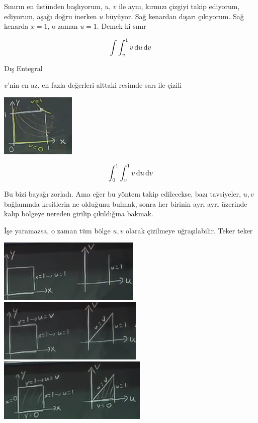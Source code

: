 \documentclass[12pt,fleqn]{article}\usepackage{../../common}
\begin{document}
Sınırın en üstünden başlıyorum, $u$, $v$ ile aynı, kırmızı çizgiyi takip
ediyorum, ediyorum, aşağı doğru inerken $u$ büyüyor. Sağ kenardan dışarı
çıkıyorum. Sağ kenarda $x=1$, o zaman $u = 1$. Demek ki sınır

$$ \int \int _v^1 v \,\mathrm{d} u \,\mathrm{d} v $$

Dış Entegral 

$v$'nin en az, en fazla değerleri alttaki resimde sarı ile çizili

\begin{center}
\includegraphics[height=3cm]{18_8.png}
\end{center}

$$ \int_0^1 \int _v^1 v \,\mathrm{d} u \,\mathrm{d} v $$

Bu bizi bayağı zorladı. Ama eğer bu yöntem takip edilecekse, bazı tavsiyeler,
$u,v$ bağlamında kesitlerin ne olduğunu bulmak, sonra her birinin ayrı ayrı
üzerinde kalıp bölgeye nereden girilip çıkıldığına bakmak.

İşe yaramazsa, o zaman tüm bölge $u,v$ olarak çizilmeye
uğraşılabilir. Teker teker 

\begin{center}
\includegraphics[height=3cm]{18_9.png}
\includegraphics[height=3cm]{18_10.png}
\includegraphics[height=3cm]{18_11.png}
\end{center}
\end{document}
